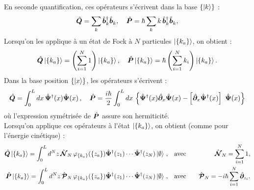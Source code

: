 En seconde quantification, ces opérateurs s'écrivent dans la base \( \{ \ket{k} \} \) : 
\begin{equation}
	\hat{\bm{Q}} = \sum_{k}  \hat{\bm{b}}^\dagger_k \hat{\bm{b}}_k^{} , \quad  \hat{\bm{P}} = \hbar\sum_{k} k \, \hat{\bm{b}}^\dagger_k \hat{\bm{b}}_k^{},\label{eq.chap.1.Q.P.k.1}
\end{equation}
Lorsqu’on les applique à un état de Fock à $N$ particules \(\ket{\{k_a\}}\), on obtient :
\begin{eqnarray}\label{eq.chap.1.Q.P.k.2}
	\hat{\bm{Q}} \ket{\{k_a\}} = \left( \sum_{i = 1}^N 1 \right) \ket{\{k_a\}},\quad \hat{\bm{P}} \ket{\{k_a\}} = \hbar \left( \sum_{i = 1}^N k_i \right) \ket{\{k_a\}}.
\end{eqnarray}
Dans la base position \( \{ \ket{x} \} \), les opérateurs s’écrivent : 
\begin{eqnarray}\label{eq.chap.1.Q.P.k.3}
	\operator{Q}  =  \int_0^L dx \, \operator{\Psi}^\dag (x) \operator{\Psi} (x) \, , \quad 
	\operator{P}  =  \frac{i\hbar}2 \int_0^L dx \, \left \{  \operator{\Psi}^\dag(x) \operator{\partial}_x \operator{\Psi}(x) - \left [\operator{\partial}_x \operator{\Psi}^\dag(x)\right ] \operator{\Psi}(x)\right \} 
\end{eqnarray}
où l'expression symétrisée de $\hat{\bm{P}}$ assure son hermiticité.\\ 
Lorsqu'on applique ces opérateurs à l’état \(\ket{\{k_a\}}\), on obtient (comme pour l’énergie cinétique) :
\begin{eqnarray}
	\hat{\bm{Q}}\ket{ \{k_a\}} =  \int_0^L d^N z \, \hat{\bm{\mathcal{N}}}_N \, \varphi_{\{k_a\}}(\{z_a\} ) \hat{\bm{\Psi}}^\dag(z_1) \cdots \hat{\bm{\Psi}}^\dag(z_N) \ket{\emptyset}\, , \quad &\mbox{avec}& \quad \hat{\bm{\mathcal{N}}}_N = \sum_{i=1}^N 1,\label{eq.chap.1.Q.1}\\
	\hat{\bm{P}}\ket{ \{k_a\}} =  \int_0^L d^N z \, \hat{\bm{\mathcal{P}}}_N \, \varphi_{\{k_a\}}(\{z_a\} ) \hat{\bm{\Psi}}^\dag(z_1) \cdots \hat{\bm{\Psi}}^\dag(z_N) \ket{\emptyset}\, , \quad &\mbox{avec}& \quad \hat{\bm{\mathcal{P}}}_N = -i\hbar \sum_{i=1}^N \hat{\bm{\partial}}_{z_i}\label{eq.chap.1.P.1}.
\end{eqnarray}

